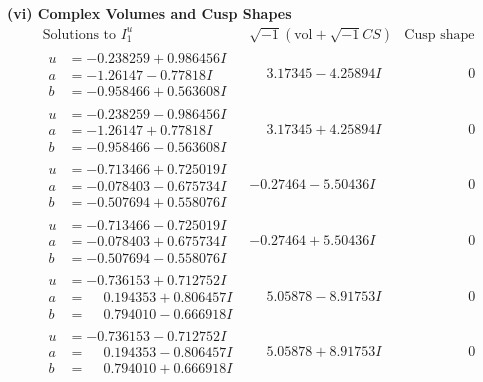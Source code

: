 \documentclass[1p]{elsarticle_modified}
\theoremstyle{definition}
\newcommand{\I}{\sqrt{-1}}
\begin{document}
\newpage\flushleft \textbf{(vi) Complex Volumes and Cusp Shapes}
$$\begin{array}{c|c|c}  
\text{Solutions to }I^u_{1}& \I (\text{vol} + \sqrt{-1}CS) & \text{Cusp shape}\\
 \hline 
\begin{aligned}
u &= -0.238259 + 0.986456 I \\
a &= -1.26147 - 0.77818 I \\
b &= -0.958466 + 0.563608 I\end{aligned}
 & \phantom{-}3.17345 - 4.25894 I & \phantom{-0.000000 } 0 \\ \hline\begin{aligned}
u &= -0.238259 - 0.986456 I \\
a &= -1.26147 + 0.77818 I \\
b &= -0.958466 - 0.563608 I\end{aligned}
 & \phantom{-}3.17345 + 4.25894 I & \phantom{-0.000000 } 0 \\ \hline\begin{aligned}
u &= -0.713466 + 0.725019 I \\
a &= -0.078403 - 0.675734 I \\
b &= -0.507694 + 0.558076 I\end{aligned}
 & -0.27464 - 5.50436 I & \phantom{-0.000000 } 0 \\ \hline\begin{aligned}
u &= -0.713466 - 0.725019 I \\
a &= -0.078403 + 0.675734 I \\
b &= -0.507694 - 0.558076 I\end{aligned}
 & -0.27464 + 5.50436 I & \phantom{-0.000000 } 0 \\ \hline\begin{aligned}
u &= -0.736153 + 0.712752 I \\
a &= \phantom{-}0.194353 + 0.806457 I \\
b &= \phantom{-}0.794010 - 0.666918 I\end{aligned}
 & \phantom{-}5.05878 - 8.91753 I & \phantom{-0.000000 } 0 \\ \hline\begin{aligned}
u &= -0.736153 - 0.712752 I \\
a &= \phantom{-}0.194353 - 0.806457 I \\
b &= \phantom{-}0.794010 + 0.666918 I\end{aligned}
 & \phantom{-}5.05878 + 8.91753 I & \phantom{-0.000000 } 0 \\ \hline\begin{aligned}

\end{aligned}
\end{array}$$
\end{document}
